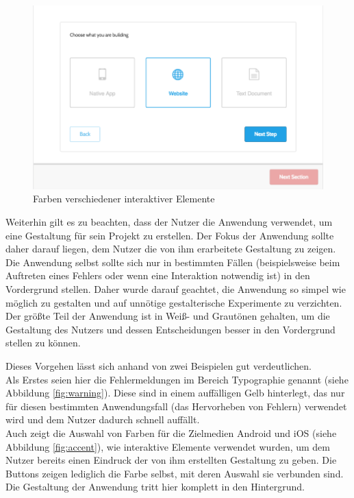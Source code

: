 \begin{figure}[h]
    \centering
    \includegraphics[width=1\textwidth]{images/25knots_entrance.png}
    \caption{Farben verschiedener interaktiver Elemente}
    \label{fig:entrance}
\end{figure}

Weiterhin gilt es zu beachten, dass der Nutzer die Anwendung verwendet, um eine Gestaltung für sein Projekt zu erstellen. Der Fokus der Anwendung sollte daher darauf liegen, dem Nutzer die von ihm erarbeitete Gestaltung zu zeigen. Die Anwendung selbst sollte sich nur in bestimmten Fällen (beispielsweise beim Auftreten eines Fehlers oder wenn eine Interaktion notwendig ist) in den Vordergrund stellen. Daher wurde darauf geachtet, die Anwendung so simpel wie möglich zu gestalten und auf unnötige gestalterische Experimente zu verzichten. Der größte Teil der Anwendung ist in Weiß- und Grautönen gehalten, um die Gestaltung des Nutzers und dessen Entscheidungen besser in den Vordergrund stellen zu können.

Dieses Vorgehen lässt sich anhand von zwei Beispielen gut verdeutlichen.\\
Als Erstes seien hier die Fehlermeldungen im Bereich Typographie genannt (siehe Abbildung \ref{fig:warning}). Diese sind in einem auffälligen Gelb hinterlegt, das nur für diesen bestimmten Anwendungsfall (das Hervorheben von Fehlern) verwendet wird und dem Nutzer dadurch schnell auffällt.\\
Auch zeigt die Auswahl von Farben für die Zielmedien Android und iOS (siehe Abbildung \ref{fig:accent}), wie interaktive Elemente verwendet wurden, um dem Nutzer bereits einen Eindruck der von ihm erstellten Gestaltung zu geben. Die Buttons zeigen lediglich die Farbe selbst, mit deren Auswahl sie verbunden sind. Die Gestaltung der Anwendung tritt hier komplett in den Hintergrund.

